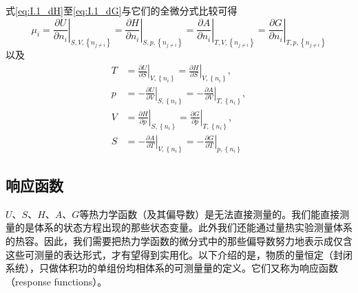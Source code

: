 \documentclass[main.tex]{subfiles}
\begin{document}
式\eqref{eq:I.1_dH}至\eqref{eq:I.1_dG}与它们的全微分式比较可得
\begin{equation}
    \mu_i=\left.\frac{\partial U}{\partial n_i}\right|_{S,V,\left\{n_{j\neq i}\right\}}
    =\left.\frac{\partial H}{\partial n_i}\right|_{S,p,\left\{n_{j\neq i}\right\}}
    =\left.\frac{\partial A}{\partial n_i}\right|_{T,V,\left\{n_{j\neq i}\right\}}
    =\left.\frac{\partial G}{\partial n_i}\right|_{T,p,\left\{n_{j\neq i}\right\}}\label{eq:I.1_first_order_partial_mu}
\end{equation}
以及
\begin{align}
    T & =\left.\frac{\partial U}{\partial S}\right|_{V,\left\{n_i\right\}}=\left.\frac{\partial H}{\partial S}\right|_{V,\left\{n_i\right\}},\label{eq:I.1_first_order_partial_T}   \\
    p & =-\left.\frac{\partial U}{\partial V}\right|_{S,\left\{n_i\right\}}=-\left.\frac{\partial A}{\partial V}\right|_{T,\left\{n_i\right\}},\label{eq:I.1_first_order_partial_p} \\
    V & =\left.\frac{\partial H}{\partial p}\right|_{S,\left\{n_i\right\}}=\left.\frac{\partial G}{\partial p}\right|_{T,\left\{n_i\right\}},\label{eq:I.1_first_order_partial_V}   \\
    S & =-\left.\frac{\partial A}{\partial T}\right|_{V,\left\{n_i\right\}}=-\left.\frac{\partial G}{\partial T}\right|_{p,\left\{n_i\right\}}\label{eq:I.1_first_order_partial_S}
\end{align}

\subsection{响应函数}
$U$、$S$、$H$、$A$、$G$等热力学函数（及其偏导数）是无法直接测量的。我们能直接测量的是体系的状态方程出现的那些状态变量。此外我们还能通过量热实验测量体系的热容。因此，我们需要把热力学函数的微分式中的那些偏导数努力地表示成仅含这些可测量的表达形式，才有望得到实用化。以下介绍的是，物质的量恒定（封闭系统），只做体积功的单组份均相体系的可测量量的定义。它们又称为响应函数（response functions）。
\end{document}
